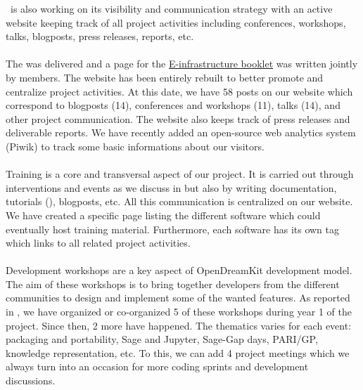 \documentclass{deliverablereport}
\begin{document}
  \ODK\ is also working on its visibility and communication strategy with an active website keeping track of all
  project activities including conferences, workshops, talks, blogposts, press releases, reports, etc.
  
\paragraph{}

The  was delivered and a page for the \href{https://github.com/OpenDreamKit/OpenDreamKit/blob/master/Communication/eInfra-Booklet/ODK.md}{E-infrastructure booklet} was written jointly by \ODK members. The website has been 
entirely rebuilt to better promote  and centralize project activities. At this date, 
we have 58 posts on our website which correspond to blogposts (14), conferences and workshops (11),
talks (14), and other project communication. The website also keeps track of press releases
and deliverable reports. We have recently added an open-source web analytics system (Piwik) 
to track some basic informations about our visitors.

\paragraph{}

Training is a core and transversal aspect of our project. It is carried out 
through interventions and events as we discuss in  but also
by writing documentation, tutorials (), blogposts, etc. All
this communication is centralized on our website. We have created a specific 
page listing the different software which could eventually host training material. Furthermore,
each software has its own tag which links to all related project activities.

\paragraph{}

Development workshops are a key aspect of OpenDreamKit development model. The aim of these workshops is to bring together developers from the different communities to design and implement some 
of the wanted features. As reported in , we have organized
or co-organized 5 of these workshops during year 1 of the project. Since then, 2 more have happened. The thematics varies
for each event: packaging and portability, Sage and Jupyter, Sage-Gap days, PARI/GP, knowledge representation, etc. To this,
we can add 4 project meetings which we always turn into an occasion for more coding sprints and development
discussions.
\end{document}
